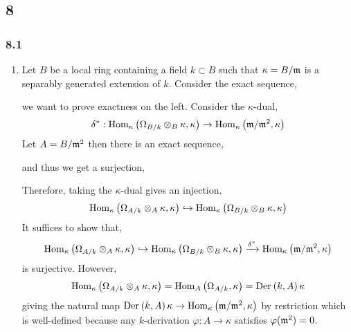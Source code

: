 \documentclass[12pt]{article}
\begin{document}
\subsection{8}

\subsubsection{8.1}

\begin{enumerate}
\item Let $B$ be a local ring containing a field $k \subset B$ such that $\kappa = B / \mathfrak{m}$ is a separably generated extension of $k$. Consider the exact sequence,
\begin{center}
\end{center}
we want to prove exactness on the left.
Consider the $\kappa$-dual,
\[ \delta^* : \mathrm{Hom}_{\kappa} \left( \Omega_{B/k} \otimes_B \kappa, \kappa \right) \to \mathrm{Hom}_{\kappa} \left( \mathfrak{m}/\mathfrak{m}^2, \kappa \right) \]
Let $A = B / \mathfrak{m}^2$ then there is an exact sequence,
\begin{center}
\end{center}
and thus we get a surjection,
\begin{center}
\end{center}
Therefore, taking the $\kappa$-dual gives an injection,
\[ \mathrm{Hom}_{\kappa} \left( \Omega_{A/k} \otimes_A \kappa, \kappa \right) \hookrightarrow \mathrm{Hom}_{\kappa} \left( \Omega_{B/k} \otimes_B \kappa , \kappa \right) \]
It suffices to show that,
\[ \mathrm{Hom}_{\kappa} \left( \Omega_{A/k} \otimes_A \kappa, \kappa \right) \hookrightarrow \mathrm{Hom}_{\kappa} \left( \Omega_{B/k} \otimes_B \kappa , \kappa \right) \xrightarrow{\delta^*} \mathrm{Hom}_{\kappa} \left( \mathfrak{m}/\mathfrak{m}^2, \kappa \right) \]
is surjective. However,
\[ \mathrm{Hom}_{\kappa} \left( \Omega_{A/k} \otimes_A \kappa, \kappa \right) = \mathrm{Hom}_{A} \left( \Omega_{A/k}, \kappa \right) = \mathrm{Der}_{} \left( k, A \right){\kappa} \]
giving the natural map $\mathrm{Der}_{} \left( k, A \right){\kappa} \to \mathrm{Hom}_{\kappa} \left( \mathfrak{m}/\mathfrak{m}^2, \kappa \right)$ by restriction which is well-defined because any $k$-derivation $\varphi : A \to \kappa$ satisfies $\varphi(\mathfrak{m}^2) = 0$.
\bigskip\\

\end{enumerate}
\end{document}
